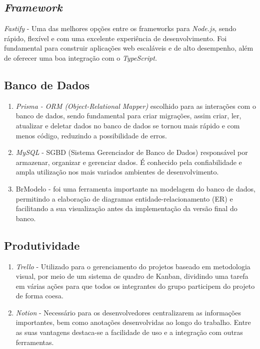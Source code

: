 \subsection{\textit{Framework}}
\textit{Fastify} - Uma das melhores opções entre os frameworks para \textit{Node.js,} sendo rápido, flexível e com uma excelente experiência de desenvolvimento. Foi fundamental para construir aplicações web escaláveis e de alto desempenho, além de oferecer uma boa integração com o \textit{TypeScript.}

\subsection{Banco de Dados}

\begin{enumerate}

	\item \textit{Prisma - ORM (Object-Relational Mapper)} escolhido para as interações com o banco de dados, sendo fundamental para criar migrações, assim criar, ler, atualizar e deletar dados no banco de dados se tornou mais rápido e com menos código, reduzindo a possibilidade de erros.
	
	\item  \textit{MySQL} - SGBD (Sistema Gerenciador de Banco de Dados) responsável por armazenar, organizar e gerenciar dados. É conhecido pela confiabilidade e ampla utilização nos mais variados ambientes de desenvolvimento.
	
	\item BrModelo -  foi uma ferramenta importante na modelagem do banco de dados, permitindo a elaboração de diagramas entidade-relacionamento (ER) e facilitando a sua visualização antes da implementação da versão final do banco.
	
\end{enumerate}

\subsection{Produtividade}

\begin{enumerate}
	
	\item \textit{Trello} - Utilizado para o gerenciamento do projetos baseado em metodologia visual, por meio de um sistema de quadro de Kanban, dividindo uma tarefa em várias ações para que todos os integrantes do grupo participem do projeto de forma coesa.
	
	\item \textit{ Notion} -  Necessário para os desenvolvedores centralizarem as informações importantes, bem como anotações desenvolvidas ao longo do trabalho. Entre as suas vantagens destaca-se a facilidade de uso e a integração com outras ferramentas.
	
\end{enumerate}

